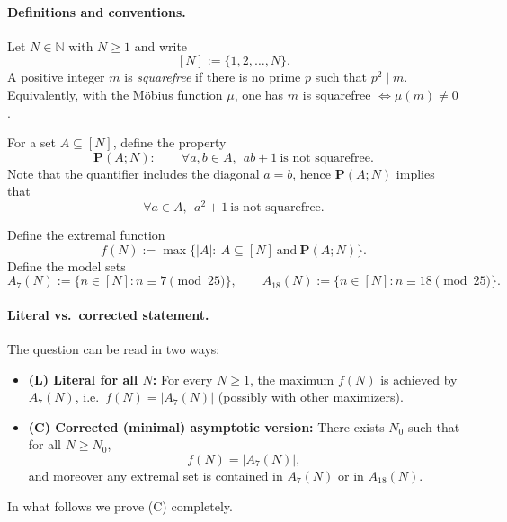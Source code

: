 \paragraph{Definitions and conventions.}
Let $N\in\mathbb{N}$ with $N\ge 1$ and write
\[
[N]:=\{1,2,\dots,N\}.
\]
A positive integer $m$ is \emph{squarefree} if there is no prime $p$ such that $p^2\mid m$.
Equivalently, with the M\"obius function $\mu$, one has $m$ is squarefree $\Longleftrightarrow \mu(m)\neq 0$.

For a set $A\subseteq[N]$, define the property
\[
\mathbf{P}(A;N):\qquad \forall a,b\in A,\ \ ab+1\ \text{is not squarefree}.
\]
Note that the quantifier includes the diagonal $a=b$, hence $\mathbf{P}(A;N)$ implies that
\[
\forall a\in A,\ \ a^2+1 \ \text{is not squarefree}.
\]

Define the extremal function
\[
f(N):=\max\{|A|:\ A\subseteq[N]\ \text{and}\ \mathbf{P}(A;N)\}.
\]
Define the model sets
\[
A_7(N):=\{n\in[N]: n\equiv 7\pmod{25}\},\qquad
A_{18}(N):=\{n\in[N]: n\equiv 18\pmod{25}\}.
\]

\paragraph{Literal vs.\ corrected statement.}
The question can be read in two ways:

\begin{itemize}
\item \textbf{(L) Literal for all $N$:} For every $N\ge 1$, the maximum $f(N)$ is achieved by $A_7(N)$, i.e.\ $f(N)=|A_7(N)|$ (possibly with other maximizers).

\item \textbf{(C) Corrected (minimal) asymptotic version:} There exists $N_0$ such that for all $N\ge N_0$,
\[
f(N)=|A_7(N)|,
\]
and moreover any extremal set is contained in $A_7(N)$ or in $A_{18}(N)$.
\end{itemize}

In what follows we prove (C) completely.
